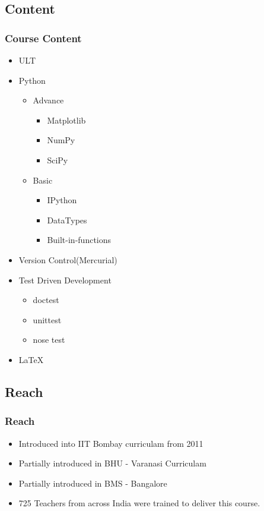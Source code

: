 \documentclass[compress,red]{beamer} %
\begin{document}
\subsection{Content}
\begin{frame}
\frametitle{Course Content}
\begin{itemize}
\item ULT
\item Python
    \begin{itemize}
        \item Advance
            \begin{itemize}
                \item Matplotlib
                \item NumPy
                \item SciPy
            \end{itemize}
        \item Basic
            \begin{itemize}
                \item IPython
                \item DataTypes
                \item Built-in-functions
            \end{itemize}
        \end{itemize}
        \item Version Control(Mercurial)
        \item Test Driven Development
            \begin{itemize}
                \item doctest
                \item unittest
                \item nose test
            \end{itemize}
        \item LaTeX
    \end{itemize}
\end{frame}


\subsection{Reach}
\begin{frame}
\frametitle{Reach}
\begin{itemize}
\item Introduced into IIT Bombay curriculam from 2011
\item Partially introduced in BHU - Varanasi Curriculam
\item Partially introduced in BMS - Bangalore
\item 725 Teachers from across India were trained to deliver this course.
\end{itemize}
\end{frame}
\end{document}
